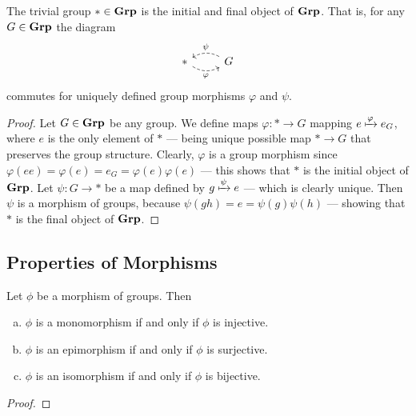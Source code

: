 \begin{proposition}
The trivial group \(* \in {\textbf{Grp}}\) is the initial and final object of \({\textbf{Grp}}\).
That is, for any \(G \in {\textbf{Grp}}\) the diagram
\[
  \begin{tikzcd}
    * \ar[r, dashed, bend right, swap, "\varphi"]
    &G \ar[l, dashed, bend right, swap, "\psi"]
  \end{tikzcd}
\]
commutes for uniquely defined group morphisms \(\varphi\) and \(\psi\).
\end{proposition}

\begin{proof}
Let \(G \in {\textbf{Grp}}\) be any group. We define maps \(\varphi: * \to G\) mapping
\(e \xmapsto\varphi e_G\), where \(e\) is the only element of \(*\) --- being
unique possible map \(* \to G\) that preserves the group structure. Clearly,
\(\varphi\) is a group morphism since \(\varphi(e e) = \varphi(e) = e_G =
\varphi(e) \varphi(e)\) --- this shows that \(*\) is the initial object of
\({\textbf{Grp}}\). Let \(\psi: G \to *\) be a map defined by \(g \xmapsto\psi e\) ---
which is clearly unique. Then \(\psi\) is a morphism of groups, because
\(\psi(g h) = e = \psi(g) \psi(h)\) --- showing that \(*\) is the final object
of \({\textbf{Grp}}\).
\end{proof}

\subsection{Properties of Morphisms}

\begin{proposition}
\label{prop:mono-epi-iso-in-grp}
Let \(\phi\) be a morphism of groups. Then
\begin{enumerate}[(a)]\setlength\itemsep{0em}
\item \(\phi\) is a monomorphism if and only if \(\phi\) is injective.
\item \(\phi\) is an epimorphism if and only if \(\phi\) is surjective.
\item \(\phi\) is an isomorphism if and only if \(\phi\) is bijective.
\end{enumerate}
\end{proposition}

\begin{proof}
\end{proof}

